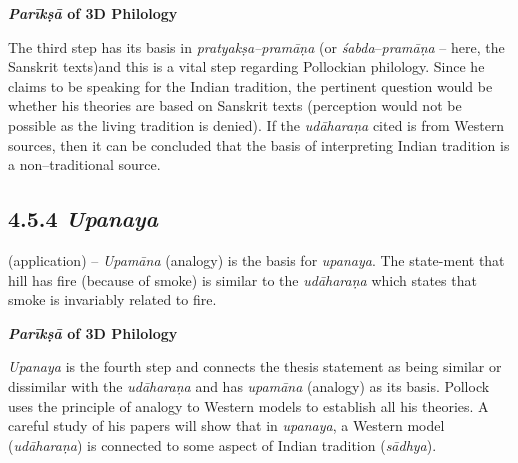 \textbf{\textit{Parīkṣā} of 3D Philology}

The third step has its basis in \textit{pratyakṣa–pramāṇa} (or \textit{śabda}–\textit{pramāṇa} – here, the Sanskrit texts)and this is a vital step regarding Pollockian philology. Since he claims to be speaking for the Indian tradition, the pertinent question would be whether his theories are based on Sanskrit texts (perception would not be possible as the living tradition is denied). If the\textit{ udāharaṇa }cited is from Western sources, then it can be concluded that the basis of interpreting Indian tradition is a non–traditional source.

\vspace{-.3cm}

\subsection*{4.5.4 {\it{\bfseries Upanaya}}}

\vspace{-.2cm}

(application) – \textit{Upamāna} (analogy) is the basis for \textit{upanaya}. The state-\break ment that hill has fire (because of smoke) is similar to the \textit{udāharaṇa} which states that smoke is invariably related to fire.

\textbf{\textit{Parīkṣā} of 3D Philology}

\textit{Upanaya} is the fourth step and connects the thesis statement as being similar or dissimilar with the \textit{udāharaṇa} and has \textit{upamāna} (analogy) as its basis. Pollock uses the principle of analogy to Western models to establish all his theories. A careful study of his papers will show that in \textit{upanaya}, a Western model (\textit{udāharaṇa}) is connected to some aspect of Indian tradition (\textit{sādhya}).

\vspace{-.3cm}

